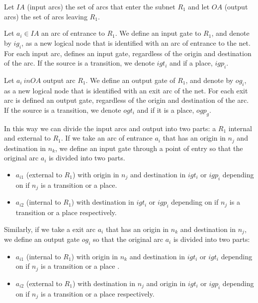 {Let $ IA $ (input arcs) the set of arcs that enter the subnet $ R_1 $ and let $ OA $ (output arcs) the set of arcs leaving $ R_1 $.

\begin{definition}
Let $ a_i \in IA $ an arc of entrance to $ R_1 $. We define an input gate to $ R_1 $, and denote by $ ig_i $, as a new logical node that is identified with an arc of entrance to the net. For each input arc, defines an input gate, regardless of the origin and destination of the arc. If the source is a transition, we denote $ igt_i $ and if a place, $ igp_i $.
\end{definition}

\begin{definition}
Let $ a_i \ in OA $ output arc $ R_1 $. We define an output gate of $ R_1 $, and denote by $ og_i $, as a new logical node that is identified with an exit arc of the net. For each exit arc is defined an output gate, regardless of the origin and destination of the arc. If the source is a transition, we denote $ ogt_i $ and if it is a place, $ ogp_g$.
\end{definition}

In this way we can divide the input arcs and output into two parts: a $ R_1 $ internal and external to $ R_1 $. If we take an arc of entrance $ a_i $ that has an origin in $n_j $ and destination
in $ n_k $, we define an input gate through a point of entry so that the original arc $ a_i $ is divided into two parts.
\begin{itemize}
  \item $a_{i1}$ (external to $R_1$) with origin in $n_j$ and destination  in $igt_i$ or $igp_i$ depending on if $n_j$ is a transition or a place.
  \item $a_{i2}$ (internal to $R_1$) with destination in $igt_i$ or $igp_i$ depending on if $n_j$ is a transition or a place respectively.
\end{itemize}

Similarly, if we take a exit arc $ a_i $ that has an origin in $ n_k $ and destination in $ n_j $, we define an output gate $ og_i $ so that the original arc $ a_i $ is divided into two parts:
\begin{itemize}
  \item $a_{i1}$ (internal to $R_1$) with origin in $n_k$ and destination
  in $igt_i$ or $igt_i$ depending on if $n_j$ is a transition or a place
.
  \item $a_{i2}$ (external to $R_1$) with destination in $n_j$ and origin
  in $igt_i$ or $igp_i$ depending on if $n_j$ is a transition or a place
  respectively. 
\end{itemize}

}
